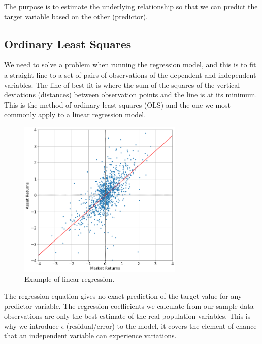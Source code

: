 The purpose is to estimate the underlying relationship so that we can predict the target variable based on the other (predictor).


\subsection{Ordinary Least Squares}
We need to solve a problem when running the regression model, and this is to fit a straight line to a set of pairs of observations of the dependent and independent variables. The line of best fit is where the sum of the squares of the vertical deviations (distances) between observation points and the line is at its minimum. This is the method of ordinary least squares (OLS) and the one we most commonly apply to a linear regression model.

\begin{figure}[htbp]
\centering
\includegraphics[width=0.7\textwidth]{figures/linear_regression}
\caption{Example of linear regression.}
\label{fig:linear_regression_example}
\end{figure}

The regression equation gives no exact prediction of the target value for any predictor variable. The regression coefficients we calculate from our sample data observations are only the best estimate of the real population variables.
This is why we introduce $\epsilon$ (residual/error) to the model, it covers the element of chance that an independent variable can experience variations.

